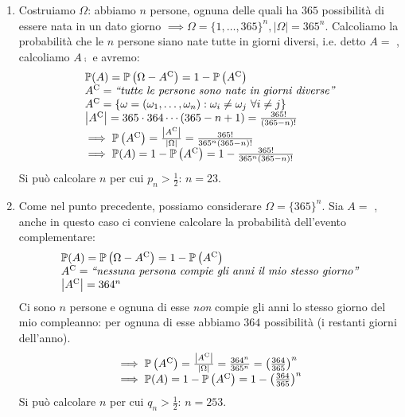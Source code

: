 \begin{enumerate}
	\item Costruiamo $\Omega $: abbiamo $n$ persone, ognuna delle quali ha $365$ possibilità di essere nata in un dato giorno $\implies \Omega =\{1,\dots,365\}^{n} ,| \Omega | =365^{n}$. Calcoliamo la probabilità che le $n$ persone siano nate tutte in giorni diversi, i.e. detto $A=$ , calcoliamo $A\comp$ e avremo:
	\begin{equation*}
		\begin{array}{ l }
			\mathbb{P}(A) =\mathbb{P}\left(\Omega -A^{\mathrm{C}}\right) =1-\mathbb{P}\left(A^{\mathrm{C}}\right)\\
			A^{\mathrm{C}} =\emph{``tutte le persone sono nate in giorni diverse''}\\
			A^{\mathrm{C}} =\{\omega =(\omega_{1} ,\dots ,\omega_{n}) :\omega_{i} \neq \omega_{j} \ \forall i\neq j\}\\
			\left| A^{\mathrm{C}}\right| =365\cdot 364\cdots (365-n+1) =\frac{365!}{(365-n) !}\\
			\implies \mathbb{P}\left(A^{\mathrm{C}}\right) =\frac{\left| A^{\mathrm{C}}\right| }{| \Omega | } =\frac{365!}{365^{n}(365-n) !}\\
			\implies \mathbb{P}(A) =1-\mathbb{P}\left(A^{\mathrm{C}}\right) =1-\frac{365!}{365^{n}(365-n) !}
		\end{array}
	\end{equation*}
	Si può calcolare $n$ per cui $p_{n}  >\frac{1}{2}$: $n=23$.
	\item Come nel punto precedente, possiamo considerare $\Omega =\{365\}^{n}$. Sia $A=$ , anche in questo caso ci conviene calcolare la probabilità dell'evento complementare:
	\begin{equation*}
		\begin{array}{ l }
			\mathbb{P}(A) =\mathbb{P}\left(\Omega -A^{\mathrm{C}}\right) =1-\mathbb{P}\left(A^{\mathrm{C}}\right)\\
			A^{\mathrm{C}} =\emph{``nessuna persona compie gli anni il mio stesso giorno''}\\
			\left| A^{\mathrm{C}}\right| =364^{n}
		\end{array}
	\end{equation*}
	Ci sono $n$ persone e ognuna di esse \textit{non} compie gli anni lo stesso giorno del mio compleanno: per ognuna di esse abbiamo $364$ possibilità (i restanti giorni dell'anno).
	\begin{equation*}
		\begin{array}{ l }
			\implies \mathbb{P}\left(A^{\mathrm{C}}\right) =\frac{\left| A^{\mathrm{C}}\right| }{| \Omega | } =\frac{364^{n}}{365^{n}} =\left(\frac{364}{365}\right)^{n}\\
			\implies \mathbb{P}(A) =1-\mathbb{P}\left(A^{\mathrm{C}}\right) =1-\left(\frac{364}{365}\right)^{n}
		\end{array}
	\end{equation*}
	Si può calcolare $n$ per cui $q_{n}  >\frac{1}{2}$: $n=253$.
\end{enumerate}


